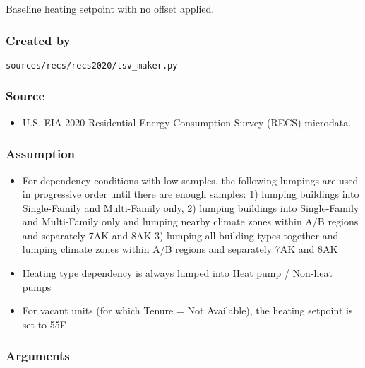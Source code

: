Baseline heating setpoint with no offset applied.

\subsubsection{Created by}\label{created-by-87}

\texttt{sources/recs/recs2020/tsv\_maker.py}

\subsubsection{Source}\label{source-86}

\begin{itemize}
 
\item
  U.S. EIA 2020 Residential Energy Consumption Survey (RECS) microdata.
\end{itemize}

\subsubsection{Assumption}\label{assumption-51}

\begin{itemize}
 
\item
  For dependency conditions with low samples, the following lumpings are
  used in progressive order until there are enough samples: 1) lumping
  buildings into Single-Family and Multi-Family only, 2) lumping
  buildings into Single-Family and Multi-Family only and lumping nearby
  climate zones within A/B regions and separately 7AK and 8AK 3) lumping
  all building types together and lumping climate zones within A/B
  regions and separately 7AK and 8AK
\item
  Heating type dependency is always lumped into Heat pump / Non-heat
  pumps
\item
  For vacant units (for which Tenure = \textquotesingle Not
  Available\textquotesingle), the heating setpoint is set to 55F
\end{itemize}

\subsubsection{Arguments}\label{arguments-55}

